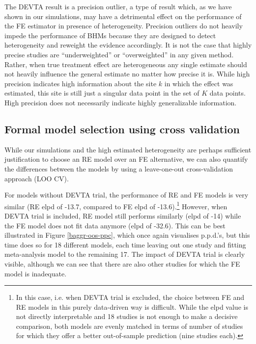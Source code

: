 \documentclass[12pt]{article}
\begin{document}

The DEVTA result is a precision outlier, a type of result which, as we have shown in our simulations, may have a detrimental effect on the performance of the FE estimator in presence of heterogeneity. Precision outliers do not heavily impede the performance of BHMs because they are designed to detect heterogeneity and reweight the evidence accordingly. It is not the case that highly precise studies are ``underweighted'' or ``overweighted'' in any given method. Rather, when true treatment effect are heterogeneous any single estimate should not heavily influence the general estimate no matter how precise it is. While high precision indicates high information about the site $k$ in which the effect was estimated, this site is still just a singular data point in the set of $K$ data points. High precision does not necessarily indicate highly generalizable information. 


\subsection{Formal model selection using cross validation}

While our simulations and the high estimated heterogeneity are perhaps sufficient justification to choose an RE model over an FE alternative, we can also quantify the differences between the models by using a leave-one-out cross-validation approach (LOO CV).

For models without DEVTA trial, the performance of RE and FE models is very similar (RE elpd of -13.7, compared to FE elpd of -13.6).\footnote{In this case, i.e. when DEVTA trial is excluded, the choice between FE and RE models in this purely data-driven way is difficult. While the elpd value is not directly interpretable and 18 studies is not enough to make a decisive comparison, both models are evenly matched in terms of number of studies for which they offer a better out-of-sample prediction (nine studies each).} However, when DEVTA trial is included, RE model still performs similarly (elpd of -14) while the FE model does not fit data anymore (elpd of -32.6). This can be best illustrated in Figure \ref{baggr-oos-ppc}, which once again visualises p.p.d.'s, but this time does so for 18 different models, each time leaving out one study and fitting meta-analysis model to the remaining 17. The impact of DEVTA trial is clearly visible, although we can see that there are also other studies for which the FE model is inadequate.
\end{document}
